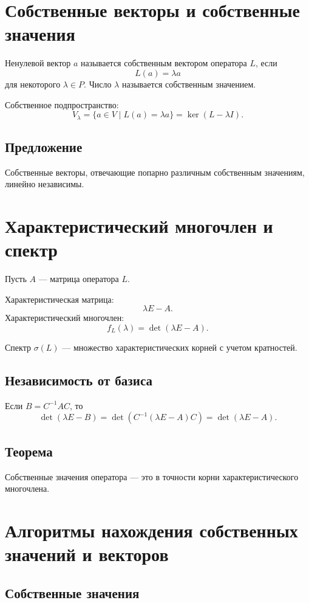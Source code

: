 \documentclass[12pt,a4paper]{article}
\DeclareMathOperator{\Ker}{ker}
\begin{document}
\section{Собственные векторы и собственные значения}

Ненулевой вектор $a$ называется собственным вектором оператора $L$, если
\[
    L(a)=\lambda a
\]
для некоторого $\lambda\in P$. Число $\lambda$ называется собственным значением.

Собственное подпространство:
\[
    V_\lambda=\{a\in V\mid L(a)=\lambda a\}=\Ker(L-\lambda I).
\]

\subsection*{Предложение}

Собственные векторы, отвечающие попарно различным собственным значениям, линейно независимы.

\section{Характеристический многочлен и спектр}

Пусть $A$ --- матрица оператора $L$.

Характеристическая матрица:
\[
    \lambda E-A.
\]
Характеристический многочлен:
\[
    f_L(\lambda)=\det(\lambda E-A).
\]

Спектр $\sigma(L)$ --- множество характеристических корней с учетом кратностей.

\subsection*{Независимость от базиса}

Если $B=C^{-1}AC$, то
\[
    \det(\lambda E-B)=\det(C^{-1}(\lambda E-A)C)=\det(\lambda E-A).
\]

\subsection*{Теорема}

Собственные значения оператора --- это в точности корни характеристического многочлена.

\section{Алгоритмы нахождения собственных значений и векторов}

\subsection*{Собственные значения}
\end{document}
